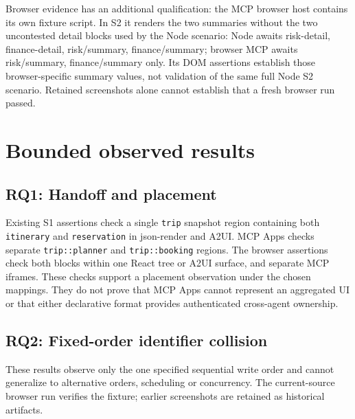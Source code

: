\documentclass[11pt]{article}
\begin{document}
Browser evidence has an additional qualification: the MCP browser host
contains its own fixture script. In S2 it renders the two summaries
without the two uncontested detail blocks used by the Node scenario:
Node awaits risk-detail, finance-detail, risk/summary, finance/summary;
browser MCP awaits risk/summary, finance/summary only. Its DOM
assertions establish those browser-specific summary values, not
validation of the same full Node S2 scenario. Retained screenshots alone
cannot establish that a fresh browser run passed.

\section{Bounded observed results}\label{bounded-observed-results}

\subsection{RQ1: Handoff and placement}\label{rq1-handoff-and-placement}

Existing S1 assertions check a single \texttt{trip} snapshot region
containing both \texttt{itinerary} and \texttt{reservation} in
json-render and A2UI. MCP Apps checks separate \texttt{trip::planner}
and \texttt{trip::booking} regions. The browser assertions check both
blocks within one React tree or A2UI surface, and separate MCP iframes.
These checks support a placement observation under the chosen mappings.
They do not prove that MCP Apps cannot represent an aggregated UI or
that either declarative format provides authenticated cross-agent
ownership.

\subsection{RQ2: Fixed-order identifier
collision}\label{rq2-fixed-order-identifier-collision}

These results observe only the one specified sequential write order and
cannot generalize to alternative orders, scheduling or concurrency. The
current-source browser run verifies the fixture; earlier screenshots are
retained as historical artifacts.
\end{document}
